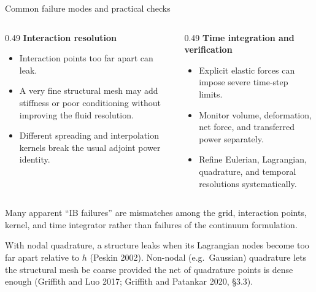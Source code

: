 \documentclass[aspectratio=169,11pt]{beamer}
\begin{document}
\begin{frame}{Common failure modes and practical checks}
\begin{columns}[T,onlytextwidth]
\begin{column}{0.49\textwidth}
\textbf{Interaction resolution}
\begin{itemize}\itemsep5pt
  \item Interaction points too far apart can leak.
  \item A very fine structural mesh may add stiffness or poor conditioning without improving the fluid resolution.
  \item Different spreading and interpolation kernels break the usual adjoint power identity.
\end{itemize}
\end{column}
\begin{column}{0.49\textwidth}
\textbf{Time integration and verification}
\begin{itemize}\itemsep5pt
  \item Explicit elastic forces can impose severe time-step limits.
  \item Monitor volume, deformation, net force, and transferred power separately.
  \item Refine Eulerian, Lagrangian, quadrature, and temporal resolutions systematically.
\end{itemize}
\end{column}
\end{columns}
\begin{punchbox}
\small Many apparent ``IB failures'' are mismatches among the grid, interaction points, kernel, and time integrator rather than failures of the continuum formulation.
\end{punchbox}
{\scriptsize With nodal quadrature, a structure leaks when its Lagrangian nodes become too far apart relative to $h$ (Peskin 2002). Non-nodal (e.g.\ Gaussian) quadrature lets the structural mesh be coarse provided the net of quadrature points is dense enough (Griffith and Luo 2017; Griffith and Patankar 2020, \S3.3).\par}
\end{frame}
\end{document}
